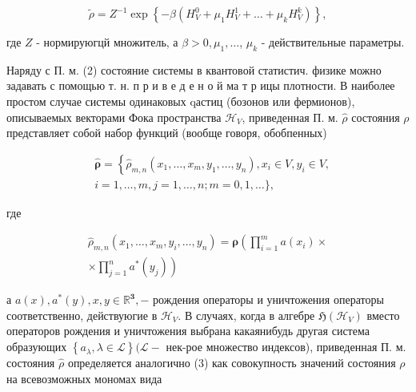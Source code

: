\documentclass[10pt]{article}
\begin{document}
\[

\tilde{\rho}=Z^{-1} \exp \left\{-\beta\left(H_{V}^{0}+\mu_{1} H_{V}^{1}+\ldots+\mu_{k} H_{V}^{k}\right)\right\},

\]



где $Z$ - нормируюгцй множитель, а $\beta>0, \mu_{1}, \ldots$, $\mu_{k}$ - действительные параметры.



Наряду с П. м. (2) состояние системы в квантовой статистич. физике можно задавать с помощью т. н. п р и в е д е н о й ма т р ицы плотности. В наиболее простом случае системы одинаковых qастиц (бозонов или фермионов), описываемых векторами Фока пространства $\mathscr{H}_{V}$, приведенная П. м. $\hat{\rho}$ состояния $\rho$ представляет собой набор функций (вообще говоря, обобпенных)



\[

\begin{aligned}

& \hat{\boldsymbol{\rho}}=\left\{\hat{\rho}_{m, n}\left(x_{1}, \ldots, x_{m}, y_{1}, \ldots, y_{n}\right), x_{i} \in V, y_{i} \in V,\right. \\

& i=1, \ldots, m, j=1, \ldots, n ; m=0,1, \ldots\} \text {, }

\end{aligned}

\]



где



\[

\begin{gathered}

\hat{\rho}_{m, n}\left(x_{1}, \ldots, x_{m}, y_{i}, \ldots, y_{n}\right)=\boldsymbol{\rho}\left(\prod_{i=1}^{m} a\left(x_{i}\right) \times\right. \\

\left.\times \prod_{j=1}^{n} a^{*}\left(y_{j}\right)\right)

\end{gathered}

\]



а $a(x), a^{*}(y), x, y \in \mathbb{R}^{\mathbf{3}},-$ рождения операторы и уничтожения операторы соответственно, действуюгие в $\mathscr{H}_{V}$. В случаях, когда в алгебре $\mathfrak{H}\left(\mathscr{H}_{V}\right)$ вместо операторов рождения и уничтожения выбрана какаянибудь другая система образующих $\left\{a_{\lambda}, \lambda \in \mathscr{L}\right\}(\mathscr{L}-$ нек-рое множество индексов), приведенная П. м. состояния $\hat{\rho}$ определяется аналогично (3) как совокупность значений состояния $\rho$ на всевозможных мономах вида
\end{document}
